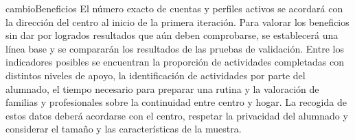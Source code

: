 \begin{cambiocontenido}{cambioBeneficios}
El número exacto de cuentas y perfiles activos se acordará con la dirección del centro al inicio de la primera iteración. Para valorar los beneficios sin dar por logrados resultados que aún deben comprobarse, se establecerá una línea base y se compararán los resultados de las pruebas de validación. Entre los indicadores posibles se encuentran la proporción de actividades completadas con distintos niveles de apoyo, la identificación de actividades por parte del alumnado, el tiempo necesario para preparar una rutina y la valoración de familias y profesionales sobre la continuidad entre centro y hogar. La recogida de estos datos deberá acordarse con el centro, respetar la privacidad del alumnado y considerar el tamaño y las características de la muestra.
\end{cambiocontenido}
